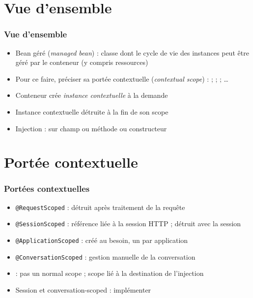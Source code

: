 \documentclass[english, french]{beamer}
\begin{document}
\section{Vue d’ensemble}
\begin{frame}
	\frametitle{Vue d’ensemble}
	\begin{itemize}
		\item Bean géré (\emph{managed bean}) : classe dont le cycle de vie des instances peut être géré par le conteneur (y compris ressources)
		\item Pour ce faire, préciser sa portée contextuelle (\emph{contextual scope}) :  ;  ;  ; …
		\item Conteneur crée \emph{instance contextuelle} à la demande
		\item Instance contextuelle détruite à la fin de son scope
		\item Injection :  sur champ {\tiny ou méthode ou constructeur}
	\end{itemize}
\end{frame}

\section{Portée contextuelle}
\begin{frame}
	\frametitle{Portées contextuelles}
	\begin{itemize}
		\item \texttt{@RequestScoped} : détruit après traitement de la requête
		\item \texttt{@SessionScoped} : référence liée à la session HTTP ; détruit avec la session
		\item \texttt{@ApplicationScoped} : créé au besoin, un par application
		\item \texttt{@ConversationScoped} : gestion manuelle de la conversation
		\item {} : pas un normal scope ; scope lié à la destination de l’injection
		\item Session et conversation-scoped : implémenter 
	\end{itemize}
\end{frame}
\end{document}
